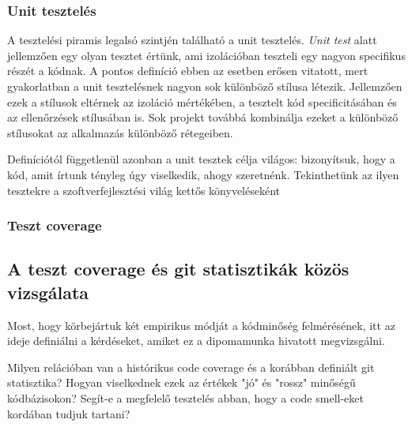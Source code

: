 \subsubsection{Unit tesztelés}

A tesztelési piramis legalsó szintjén található a unit tesztelés. \textit{Unit test} alatt jellemzően egy olyan tesztet értünk, ami izolációban teszteli egy nagyon specifikus részét a kódnak. A pontos definíció ebben az esetben erősen vitatott, mert gyakorlatban a unit tesztelésnek nagyon sok különböző stílusa létezik. Jellemzően ezek a stílusok eltérnek az izoláció mértékében, a tesztelt kód specificitásában és az ellenőrzések stílusában is. Sok projekt továbbá kombinálja ezeket a különböző stílusokat az alkalmazás különböző rétegeiben.

Definíciótól függetlenül azonban a unit tesztek célja világos: bizonyítsuk, hogy a kód, amit írtunk tényleg úgy viselkedik, ahogy szeretnénk. Tekinthetünk az ilyen tesztekre a szoftverfejlesztési világ kettős könyveléseként


\subsubsection{Teszt coverage}



\subsection{A teszt coverage és git statisztikák közös vizsgálata}

Most, hogy körbejártuk két empirikus módját a kódminőség felmérésének, itt az ideje definiálni a kérdéseket, amiket ez a dipomamunka hivatott megvizsgálni. 

Milyen relációban van a histórikus code coverage és a korábban definiált git statisztika? Hogyan viselkednek ezek az értékek "jó" és "rossz" minőségű kódbázisokon? Segít-e a megfelelő tesztelés abban, hogy a code smell-eket kordában tudjuk tartani?

